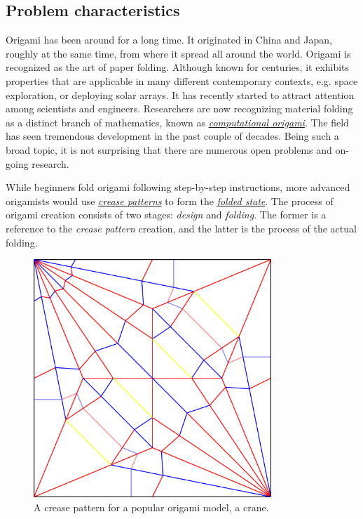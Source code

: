 \subsection{Problem characteristics}
Origami has been around for a long time. It originated in China and Japan, roughly at the same time, from where it 
spread all around the world\cite{wiki:history-of-origami}. 
Origami is recognized as the art of paper folding.
Although known for centuries, it exhibits properties that are applicable 
in many different contemporary contexts, e.g.
space exploration\cite{origami-in-orbit}, or deploying solar arrays\cite{solar-panel-origami}.
It has recently started to attract attention among scientists and engineers.
Researchers are now recognizing material folding as a distinct
branch of mathematics, known as \hyperref[dictionary:computational-origami]{\textit{computational origami}}.
The field has seen tremendous development in the past couple of decades.
Being such a broad topic, it is not surprising that there are numerous open problems \cite{mit-open-problems} and on-going research.

\medskip

While beginners fold origami following step-by-step instructions,
more advanced origamists would use \hyperref[dictionary:crease-pattern]{\textit{crease patterns}}
to form the \hyperref[dictionary:folded-state]{\textit{folded state}}.
The process of origami creation consists of two stages: \textit{design} and \textit{folding}.
The former is a reference to the \textit{crease pattern} creation, and the latter is the process of the actual folding.

\begin{figure}[H]
\caption{A crease pattern for a popular origami model, a crane.\label{fig:creasepattern}}
  \centering
    \includegraphics[width=0.8\textwidth]{assets/crane-crease-pattern.png}
\end{figure}

